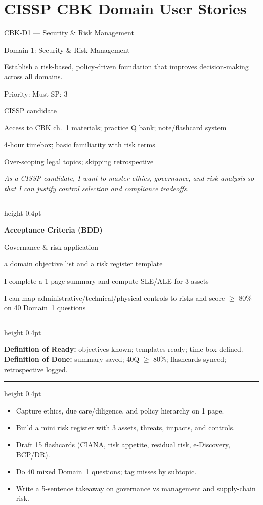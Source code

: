 \documentclass[11pt,a4paper]{article}
\providecommand{\square}{\fbox{\rule{0pt}{0.85ex}\rule{0.85ex}{0pt}}}%
\newcommand{\citem}{\item[$\square$]}
\newcommand{\Tag}[1]{\tcbox[on line, colback=PillBack, colframe=PillBack,
  coltext=PillText, boxrule=0pt, arc=2mm, left=2pt, right=2pt, top=1pt, bottom=1pt]{\small #1}}
\newcommand{\ThinRule}{\par\vspace{4pt}\hrule height 0.4pt\par\vspace{4pt}}
\begin{document}
\clearpage
\section{CISSP CBK Domain User Stories}

\begin{StoryCardBox}{CBK-D1 --- Security \& Risk Management}
\begin{metadesc}
\item[Epic / Feature] Domain 1: Security \& Risk Management
\item[Business Value] Establish a risk-based, policy-driven foundation that improves decision-making across all domains.
\item[Priority / Estimate] Priority: Must \quad SP: 3
\item[Persona] CISSP candidate
\item[Dependencies] Access to CBK ch.~1 materials; practice Q bank; note/flashcard system
\item[Assumptions] 4-hour timebox; basic familiarity with risk terms
\item[Risks] Over-scoping legal topics; skipping retrospective
\item[Story] \textit{As a CISSP candidate, I want to master ethics, governance, and risk analysis so that I can justify control selection and compliance tradeoffs.}
\item[Non-Functional] \Tag{Security} \Tag{Reliability} \Tag{Privacy}
\end{metadesc}

\ThinRule
\textbf{Acceptance Criteria (BDD)}
\begin{metadesc}
\item[Scenario] Governance \& risk application
\item[Given] a domain objective list and a risk register template
\item[When] I complete a 1-page summary and compute SLE/ALE for 3 assets
\item[Then] I can map administrative/technical/physical controls to risks and score $\geq$ 80\% on 40 Domain~1 questions
\end{metadesc}

\ThinRule
\textbf{Definition of Ready:} objectives known; templates ready; time-box defined.\newline
\textbf{Definition of Done:} summary saved; 40Q $\geq$ 80\%; flashcards synced; retrospective logged.

\ThinRule
\begin{TasksBox}
\begin{itemize}
  \citem Capture ethics, due care/diligence, and policy hierarchy on 1 page.
  \citem Build a mini risk register with 3 assets, threats, impacts, and controls.
  \citem Draft 15 flashcards (CIANA, risk appetite, residual risk, e-Discovery, BCP/DR).
  \citem Do 40 mixed Domain~1 questions; tag misses by subtopic.
  \citem Write a 5-sentence takeaway on governance vs management and supply-chain risk.
\end{itemize}
\end{TasksBox}
\end{StoryCardBox}
\end{document}
